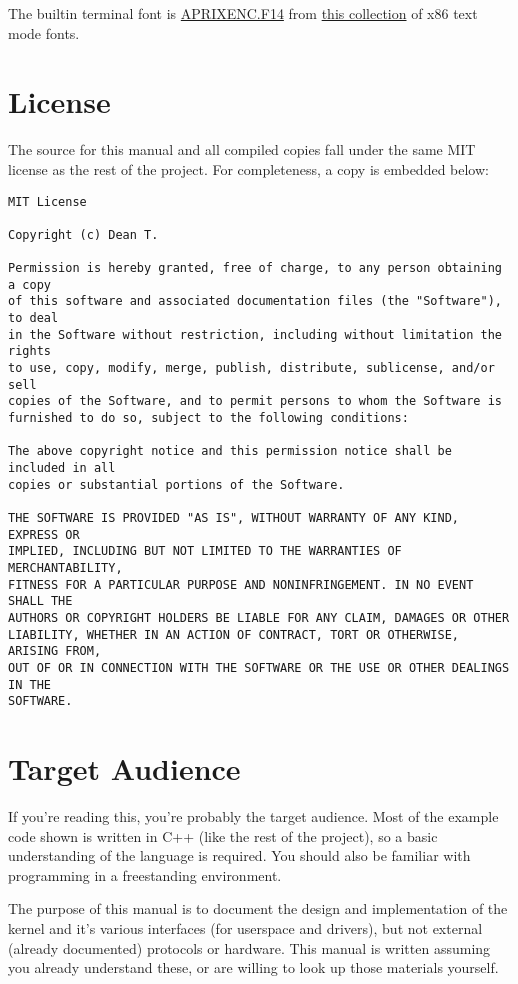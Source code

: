 The builtin terminal font is \href{https://github.com/viler-int10h/vga-text-mode-fonts/blob/master/FONTS/NON-PC/APRIXENC.F14}{APRIXENC.F14} from \href{https://github.com/viler-int10h/vga-text-mode-fonts}{this collection} of x86 text mode fonts.

\section{License}

The source for this manual and all compiled copies fall under the same MIT license as the rest of the project. For completeness, a copy is embedded below:

\begin{verbatim}
MIT License

Copyright (c) Dean T.

Permission is hereby granted, free of charge, to any person obtaining a copy
of this software and associated documentation files (the "Software"), to deal
in the Software without restriction, including without limitation the rights
to use, copy, modify, merge, publish, distribute, sublicense, and/or sell
copies of the Software, and to permit persons to whom the Software is
furnished to do so, subject to the following conditions:

The above copyright notice and this permission notice shall be included in all
copies or substantial portions of the Software.

THE SOFTWARE IS PROVIDED "AS IS", WITHOUT WARRANTY OF ANY KIND, EXPRESS OR
IMPLIED, INCLUDING BUT NOT LIMITED TO THE WARRANTIES OF MERCHANTABILITY,
FITNESS FOR A PARTICULAR PURPOSE AND NONINFRINGEMENT. IN NO EVENT SHALL THE
AUTHORS OR COPYRIGHT HOLDERS BE LIABLE FOR ANY CLAIM, DAMAGES OR OTHER
LIABILITY, WHETHER IN AN ACTION OF CONTRACT, TORT OR OTHERWISE, ARISING FROM,
OUT OF OR IN CONNECTION WITH THE SOFTWARE OR THE USE OR OTHER DEALINGS IN THE
SOFTWARE.
\end{verbatim}

\section{Target Audience}
If you're reading this, you're probably the target audience. Most of the example code shown is written in C++ (like the rest of the project), so a basic understanding of the language is required. You should also be familiar with programming in a freestanding environment.

The purpose of this manual is to document the design and implementation of the kernel and it's various interfaces (for userspace and drivers), but not external (already documented) protocols or hardware. This manual is written assuming you already understand these, or are willing to look up those materials yourself.

